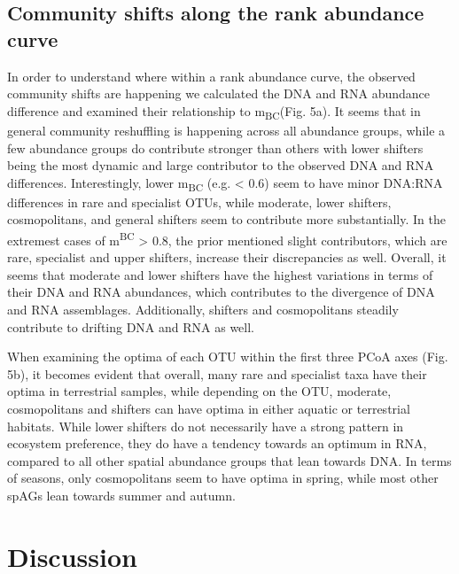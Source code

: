 \documentclass[12pt,a4paper]{article} %
\begin{document}
\subsection*{Community shifts along the rank abundance curve}
In order to understand where within a rank abundance curve, the observed community shifts are happening we calculated the DNA and RNA abundance difference and examined their relationship to m\textsubscript{BC}(Fig. 5a). It seems that in general community reshuffling is happening across all abundance groups, while a few abundance groups do contribute stronger than others with lower shifters being the most dynamic and large contributor to the observed DNA and RNA differences. Interestingly, lower m\textsubscript{BC} (e.g. < 0.6) seem to have minor DNA:RNA differences in rare and specialist OTUs, while moderate, lower shifters, cosmopolitans, and general shifters seem to contribute more substantially. In the extremest cases of m\textsuperscript{BC} > 0.8, the prior mentioned slight contributors, which are rare, specialist and upper shifters, increase their discrepancies as well. Overall, it seems that moderate and lower shifters have the highest variations in terms of their DNA and RNA abundances, which contributes to the divergence of DNA and RNA assemblages. Additionally, shifters and cosmopolitans steadily contribute to drifting DNA and RNA as well.

When examining the optima of each OTU within the first three PCoA axes (Fig. 5b), it becomes evident that overall, many rare and specialist taxa have their optima in terrestrial samples, while depending on the OTU, moderate, cosmopolitans and shifters can have optima in either aquatic or terrestrial habitats. While lower shifters do not necessarily have a strong pattern in ecosystem preference, they do have a tendency towards an optimum in RNA, compared to all other spatial abundance groups that lean towards DNA. In terms of seasons, only cosmopolitans seem to have optima in spring, while most other spAGs lean towards summer and autumn.

\section*{Discussion}

\end{document}
